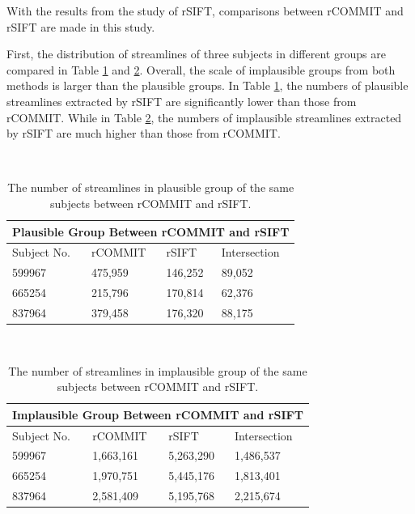 With the results from the study of rSIFT, comparisons between rCOMMIT and rSIFT are made in this study. 

First, the distribution of streamlines of three subjects in different groups are compared in Table \ref*{table:plaus} and \ref*{table:implaus}.
Overall, the scale of implausible groups from both methods is larger than the plausible groups.
In Table \ref*{table:plaus}, the numbers of plausible streamlines extracted by rSIFT are significantly lower than those from rCOMMIT.
While in Table \ref*{table:implaus}, the numbers of implausible streamlines extracted by rSIFT are much higher than those from rCOMMIT.
\begin{table}[!ht]
    \centering
    \caption{The number of streamlines in plausible group of the same subjects between rCOMMIT and rSIFT.}
    ~\\
    \label{table:plaus}
    \begin{tabular}{p{3cm}|p{3cm}|p{3cm}|p{3cm}}
    \toprule
    \multicolumn{4}{c}{\textbf{Plausible Group Between rCOMMIT and rSIFT}} \\
    \toprule
    Subject No. & rCOMMIT & rSIFT & Intersection \\
    \hline
    599967 & 475,959 &146,252 & 89,052 \\
    \hline
    665254 & 215,796 &170,814 & 62,376 \\
    \hline
    837964 & 379,458 &176,320 & 88,175 \\
    \bottomrule
    \end{tabular}
\end{table}

\begin{table}[!ht]
    \centering
    \caption{The number of streamlines in implausible group of the same subjects between rCOMMIT and rSIFT.}
    ~\\
    \label{table:implaus}
    \begin{tabular}{p{3cm}|p{3cm}|p{3cm}|p{3cm}}
    \toprule
    \multicolumn{4}{c}{\textbf{Implausible Group Between rCOMMIT and rSIFT}} \\
    \toprule
    Subject No. & rCOMMIT & rSIFT & Intersection \\
    \hline
    599967 & 1,663,161 &5,263,290 & 1,486,537 \\
    \hline
    665254 & 1,970,751 &5,445,176 & 1,813,401 \\
    \hline
    837964 & 2,581,409 &5,195,768 & 2,215,674 \\
    \bottomrule
    \end{tabular}
\end{table}

